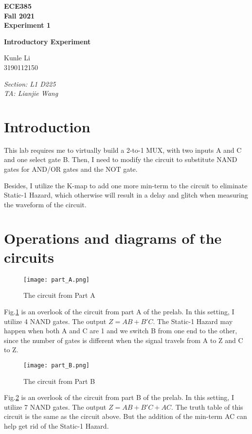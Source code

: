 \documentclass[11pt]{article}
\begin{document}
\begin{titlepage}
    \centering
    {\Huge\bfseries ECE385\\\Large Fall 2021\\\Large Experiment 1}

    \vspace{1cm}
    
    {\LARGE\bfseries Introductory Experiment}
    
    \vspace{2cm}
    
    {\Large Kunle Li\\3190112150}
    
    \vfill
    
    {\large\itshape Section: L1 D225\\TA: Lianjie Wang}
    \end{titlepage}

\section{Introduction}
This lab requires me to virtually build a 2-to-1 MUX, with two inputs A and C and one select gate B. Then, I need to modify the circuit to substitute NAND gates for AND/OR gates and the NOT gate.

Besides, I utilize the K-map to add one more min-term to the circuit to eliminate Static-1 Hazard, which otherwise will result in a delay and glitch when measuring the waveform of the circuit.

\section{Operations and diagrams of the circuits}
\begin{figure}[h]
    \centering
    \texttt{[image: part\_A.png]}
    \caption{The circuit from Part A}
    \label{a}
\end{figure}
Fig.\ref{a} is an overlook of the circuit from part A of the prelab. In this setting, I utilize 4 NAND gates. The output $Z=AB+B'C$. The Static-1 Hazard may happen when both A and C are 1 and we switch B from one end to the other, since the number of gates is different when the signal travels from A to Z and C to Z.

\begin{figure}[h]
    \centering
    \texttt{[image: part\_B.png]}
    \caption{The circuit from Part B}
    \label{b}
\end{figure}
Fig.\ref{b} is an overlook of the circuit from part B of the prelab. In this setting, I utilize 7 NAND gates. The output $Z=AB+B'C+AC$. The truth table of this circuit is the same as the circuit above. But the addition of the min-term AC can help get rid of the Static-1 Hazard.
\end{document}
